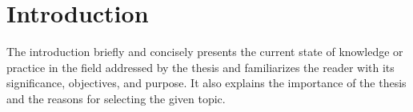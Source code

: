 \section*{Introduction}
\label{text-start}

The introduction briefly and concisely presents the current state of knowledge or practice in the field addressed by the thesis and familiarizes the reader with its significance, objectives, and purpose. It also explains the importance of the thesis and the reasons for selecting the given topic.